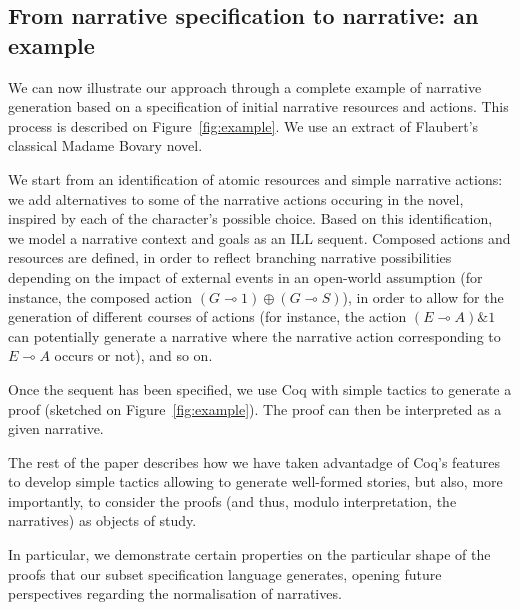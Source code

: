 \documentclass[runningheads,a4paper]{llncs}
\begin{document}
\subsection{From narrative specification to narrative: an example}
We can now illustrate our approach through a complete example of narrative generation based on a specification of initial narrative resources and actions. This process is described on Figure~\ref{fig:example}. We use an extract of Flaubert's classical Madame Bovary novel. 

We start from an identification of atomic resources and simple narrative actions: we add alternatives to some of the narrative actions occuring in the novel, inspired by each of the character's possible choice. Based on this identification, we model a narrative context and goals as an ILL sequent. Composed actions and resources are defined, in order to reflect branching narrative possibilities depending on the impact of external events in an open-world assumption (for instance, the composed action $(G\multimap 1) \oplus (G \multimap S)$), in order to allow for the generation of different courses of actions (for instance, the action $(E\multimap A) \& 1$ can potentially generate a narrative where the narrative action corresponding to $E\multimap A$ occurs or not), and so on. 

Once the sequent has been specified, we use Coq with simple tactics to generate a proof (sketched on Figure~\ref{fig:example}). The proof can then be interpreted as a given narrative.

The rest of the paper describes how we have taken advantadge of Coq's features to develop simple tactics allowing to generate well-formed stories, but also, more importantly, to consider the proofs (and thus, modulo interpretation, the narratives) as objects of study.

In particular, we demonstrate certain properties on the particular shape of the proofs that our subset specification language generates, opening future perspectives regarding the normalisation of narratives.
\end{document}
